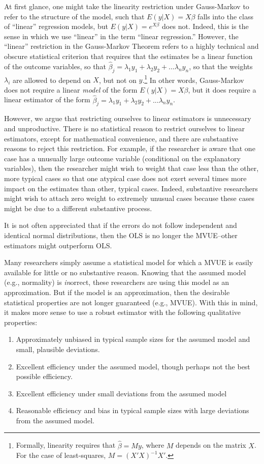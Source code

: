 \documentclass[12pt]{article}
\begin{document}
At first glance, one might take the linearity restriction under Gauss-Markov to refer to the structure of the model, such that $E(y | X) = X\beta$ falls into the class of ``linear'' regression models, but  $E(y | X) = e^{X\beta}$ does not. Indeed, this is the sense in which we use ``linear'' in the term ``linear regression.'' However, the ``linear'' restriction in the Gauss-Markov Theorem refers to a highly technical and obscure statistical criterion that requires that the estimates be a linear function of the outcome variables, so that $\hat{\beta}_j = \lambda_1 y_1 + \lambda_2 y_2 + ... \lambda_n y_n$, so that the weights $\lambda_i$ are allowed to depend on $X$, but not on $y$.\footnote{Formally, linearity requires that $\hat{\beta} = My$, where $M$ depends on the matrix $X$. For the case of least-squares, $M = (X'X)^{-1}X'$.} In other words, Gauss-Markov does not require a linear \textit{model} of the form $E(y | X) = X\beta$, but it does require a linear estimator of the form $\hat{\beta}_j = \lambda_1 y_1 + \lambda_2 y_2 + ... \lambda_n y_n$. 

However, we argue that restricting ourselves to linear estimators is unnecessary and unproductive. There is no statistical reason to restrict ourselves to linear estimators, except for mathematical convenience, and there are substantive reasons to reject this restriction. For example, if the researcher is aware that one case has a unusually large outcome variable (conditional on the explanatory variables), then the researcher might wish to weight that case less than the other, more typical cases so that one atypical case does not exert several times more impact on the estimates than other, typical cases. Indeed, substantive researchers might wish to attach zero weight to extremely unusual cases because these cases might be due to a different substantive process.

It is not often appreciated that if the errors do not follow independent and identical normal distributions, then the OLS is no longer the MVUE--other estimators might outperform OLS.

Many researchers simply assume a statistical model for which a MVUE is easily available for little or no substantive reason. Knowing that the assumed model (e.g., normality) is \textit{in}orrect, these researchers are using this model as an approximation. But if the model is an approximation, then the desirable statistical properties are not longer guaranteed (e.g., MVUE). With this in mind, it makes more sense to use a robust estimator with the following qualitative properties:
\begin{enumerate}
\item Approximately unbiased in typical sample sizes for the assumed model and small, plausible deviations.
\item Excellent efficiency under the assumed model, though perhaps not the best possible efficiency.
\item Excellent efficiency under small deviations from the assumed model
\item Reasonable efficiency and bias in typical sample sizes with large deviations from the assumed model. 
\end{enumerate}
\end{document}
